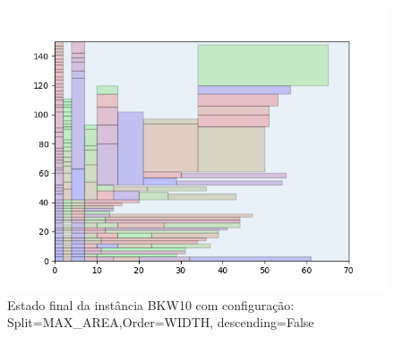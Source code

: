 \begin{figure}[H]
    \centering
    \caption[]{Estado final da instância BKW10 com configuração: Split=MAX_AREA,Order=WIDTH, descending=False}
    \label{fig:bkw10-max_area-width-false}
    \includegraphics[scale=0.5]{output/figures/bkw/bkw10/max_area/width/false/000}
\end{figure}